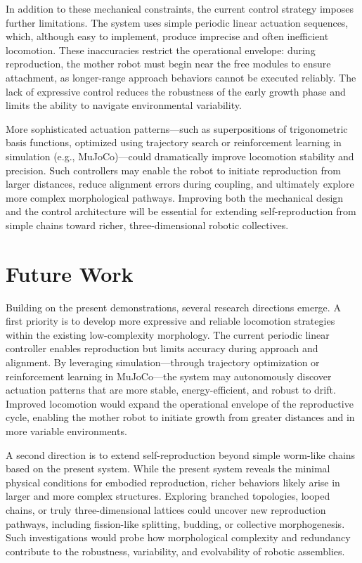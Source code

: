 \documentclass[lettersize,journal]{IEEEtran}
\begin{document}
In addition to these mechanical constraints, the current control strategy imposes further limitations. The system uses simple periodic linear actuation sequences, which, although easy to implement, produce imprecise and often inefficient locomotion. These inaccuracies restrict the operational envelope: during reproduction, the mother robot must begin near the free modules to ensure attachment, as longer-range approach behaviors cannot be executed reliably. The lack of expressive control reduces the robustness of the early growth phase and limits the ability to navigate environmental variability.

More sophisticated actuation patterns—such as superpositions of trigonometric basis functions, optimized using trajectory search or reinforcement learning in simulation (e.g., MuJoCo)—could dramatically improve locomotion stability and precision. Such controllers may enable the robot to initiate reproduction from larger distances, reduce alignment errors during coupling, and ultimately explore more complex morphological pathways. Improving both the mechanical design and the control architecture will be essential for extending self-reproduction from simple chains toward richer, three-dimensional robotic collectives.

\section{Future Work}
Building on the present demonstrations, several research directions emerge. A first priority is to develop more expressive and reliable locomotion strategies within the existing low-complexity morphology. The current periodic linear controller enables reproduction but limits accuracy during approach and alignment. By leveraging simulation—through trajectory optimization or reinforcement learning in MuJoCo—the system may autonomously discover actuation patterns that are more stable, energy-efficient, and robust to drift. Improved locomotion would expand the operational envelope of the reproductive cycle, enabling the mother robot to initiate growth from greater distances and in more variable environments.

A second direction is to extend self-reproduction beyond simple worm-like chains based on the present system. While the present system reveals the minimal physical conditions for embodied reproduction, richer behaviors likely arise in larger and more complex structures. Exploring branched topologies, looped chains, or truly three-dimensional lattices could uncover new reproduction pathways, including fission-like splitting, budding, or collective morphogenesis. Such investigations would probe how morphological complexity and redundancy contribute to the robustness, variability, and evolvability of robotic assemblies.
\end{document}
